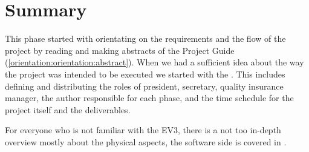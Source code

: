 \section{Summary}
This phase started with orientating on the requirements and the flow of the project by reading and making abstracts of the Project Guide (\autoref{orientation:orientation:abstract}).
When we had a sufficient idea about the way the project was intended to be executed we started with the . This includes defining and distributing the roles of president, secretary, quality insurance manager, the author responsible for each phase, and the time schedule for the project itself and the deliverables. \par
For everyone who is not familiar with the EV3, there is a not too in-depth overview  mostly about the physical aspects, the software side is covered in .